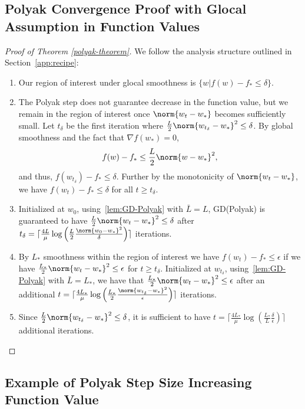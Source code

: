 \documentclass[10pt]{article} %
\newif\ifextended
\begin{document}
\subsection{Polyak Convergence Proof with Glocal Assumption in Function Values}
\label{polyak-proofs-function-values}
\fi
\begin{proof}[Proof of Theorem \ref{polyak-theorem}]
We follow the analysis structure outlined in Section~\ref{app:recipe}:
    \begin{enumerate}
        \item Our region of interest under glocal smoothness is $\{w | f(w) - f_* \leq \delta \}$.
        
        \item The Polyak step does not guarantee decrease in the function value, but we remain in the region of interest once $\norm{w_t-w_*}$ becomes sufficiently small. Let $t_\delta$ be the first iteration where $\frac{L}{2}\norm{w_{t_\delta} - w_*}^2 \leq \delta$. By global smoothness and the fact that $\nabla f(w_*) = 0$,
        \[
            f(w) - f_* \leq \frac{L}{2}\norm{w - w_*}^2,
        \] 
        and thus, $f(w_{t_\delta}) - f_* \leq \delta$. Further by the monotonicity of $\norm{w_t - w_*}$, we have $f(w_t) - f_* \leq \delta$ for all $t \geq t_\delta$.
        \item Initialized at $w_0$, using~\cref{lem:GD-Polyak} with $\bar{L} = L$, GD(Polyak) is guaranteed to have $\frac{L}{2}\norm{w_{t} - w_*}^2 \leq \delta$ after $t_\delta = \lceil \frac{4L}{\mu}\log\left(\frac{L}{2}\frac{\norm{w_0-w_*}^2}{\delta}\right) \rceil$ iterations.
        \item By $L_*$ smoothness within the region of interest we have $f(w_t) - f_* \leq \epsilon$ if we have $\frac{L_*}{2}\norm{w_t - w_*}^2 \leq \epsilon$ for $t\geq t_\delta$. Initialized at $w_{t_\delta}$, using~\cref{lem:GD-Polyak} with $\bar{L} = L_{*}$, we have that $\frac{L_*}{2}\norm{w_t - w_*}^2 \leq \epsilon$ after an additional  $t = \lceil \frac{4L_*}{\mu}\log\left(\frac{L_*}{2}\frac{\norm{w_{t_\delta}-w_*}^2}{\epsilon}\right) \rceil$ iterations. 
        \item Since $\frac{L}{2}\norm{w_{t_\delta} - w_*}^2 \leq \delta$, it is sufficient to have $t = \lceil \frac{4L_*}{\mu}\log\left(\frac{L_*}{L}\frac{\delta}{\epsilon}\right) \rceil$ additional iterations.
    \end{enumerate}
\end{proof}

\ifextended
\subsection{Example of Polyak Step Size Increasing Function Value}
\label{polyak-increase-function}
\end{document}
